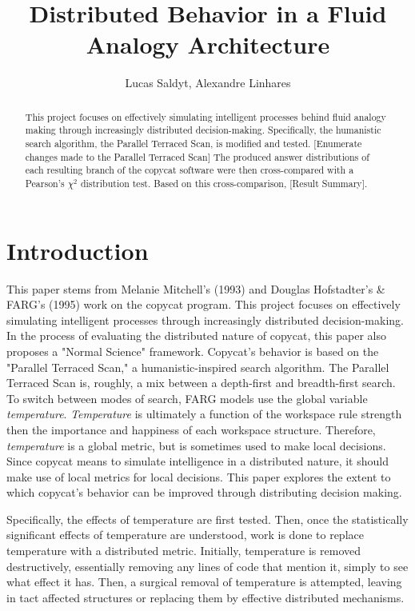 \documentclass[a4paper]{article}
\title{Distributed Behavior in a Fluid Analogy Architecture}
\author{Lucas Saldyt, Alexandre Linhares}
\begin{document}
\maketitle

\begin{abstract}
This project focuses on effectively simulating intelligent processes behind fluid analogy making through increasingly distributed decision-making.
Specifically, the humanistic search algorithm, the Parallel Terraced Scan, is modified and tested.
[Enumerate changes made to the Parallel Terraced Scan]
The produced answer distributions of each resulting branch of the copycat software were then cross-compared with a Pearson's $\chi^2$ distribution test.
Based on this cross-comparison, [Result Summary].
\end{abstract}

\section{Introduction}

This paper stems from Melanie Mitchell's (1993) and Douglas Hofstadter's \& FARG's (1995) work on the copycat program. 
\cite{geb}
This project focuses on effectively simulating intelligent processes through increasingly distributed decision-making.
In the process of evaluating the distributed nature of copycat, this paper also proposes a "Normal Science" framework. 
Copycat's behavior is based on the "Parallel Terraced Scan," a humanistic-inspired search algorithm.
The Parallel Terraced Scan is, roughly, a mix between a depth-first and breadth-first search.
To switch between modes of search, FARG models use the global variable \emph{temperature}.
\emph{Temperature} is ultimately a function of the workspace rule strength then the importance and happiness of each workspace structure.
Therefore, \emph{temperature} is a global metric, but is sometimes used to make local decisions.
Since copycat means to simulate intelligence in a distributed nature, it should make use of local metrics for local decisions.
This paper explores the extent to which copycat's behavior can be improved through distributing decision making.

Specifically, the effects of temperature are first tested. 
Then, once the statistically significant effects of temperature are understood, work is done to replace temperature with a distributed metric.
Initially, temperature is removed destructively, essentially removing any lines of code that mention it, simply to see what effect it has.
Then, a surgical removal of temperature is attempted, leaving in tact affected structures or replacing them by effective distributed mechanisms.
\end{document}
